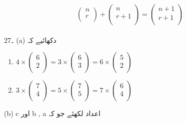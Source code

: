 \[
\begin{pmatrix}
n\\
r\\
\end{pmatrix}
+
\begin{pmatrix}
n\\
r+1\\
\end{pmatrix}
=
\begin{pmatrix}
n+1\\
r+1\\
\end{pmatrix}\]
\\
27۔ (a) دکھائیے کہ 
\begin{enumerate}
\item
\(4\times \begin{pmatrix}
6\\
2\\
\end{pmatrix}
=
3\times \begin{pmatrix}
6\\
3\\
\end{pmatrix}
=
6\times \begin{pmatrix}
5\\
2\\
\end{pmatrix}\)\\
\item
\( 3\times \begin{pmatrix}
7\\
4\\
\end{pmatrix}
=
5\times \begin{pmatrix}
7\\
5\\
\end{pmatrix}
=
7\times\begin{pmatrix}
6\\
4\\
\end{pmatrix}\)\\
\end{enumerate}
(b)
 c اور  b    , a  اعداد لکھئے جو کہ 
